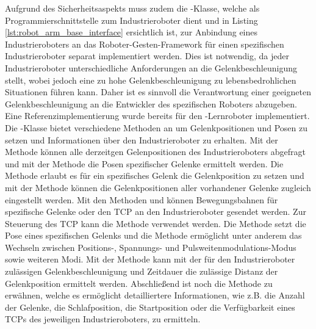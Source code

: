 Aufgrund des Sicherheitsaspekts muss zudem die -Klasse, welche als Programmierschnittstelle zum Industrieroboter dient und in Listing \ref{lst:robot_arm_base_interface} ersichtlich ist, zur Anbindung eines Industrieroboters an das Roboter-Gesten-Framework für einen spezifischen Industrieroboter separat implementiert werden. Dies ist notwendig, da jeder Industrieroboter unterschiedliche Anforderungen an die Gelenkbeschleunigung stellt, wobei jedoch eine zu hohe Gelenkbeschleunigung zu lebensbedrohlichen Situationen führen kann. Daher ist es sinnvoll die Verantwortung einer geeigneten Gelenkbeschleunigung an die Entwickler des spezifischen Roboters abzugeben. Eine Referenzimplementierung wurde bereits für den -Lernroboter implementiert. Die -Klasse bietet verschiedene Methoden an um Gelenkpositionen und Posen zu setzen und Informationen über den Industrieroboter zu erhalten. Mit der Methode  können alle derzeitgen Gelenpositionen des Industrieroboters abgefragt und mit der Methode  die Posen spezifischer Gelenke ermittelt werden. Die Methode  erlaubt es für ein spezifisches Gelenk die Gelenkposition zu setzen und mit der Methode  können die Gelenkpositionen aller vorhandener Gelenke zugleich eingestellt werden. Mit den Methoden  und  können Bewegungsbahnen für spezifische Gelenke oder den TCP an den Industrieroboter gesendet werden. Zur Steuerung des TCP kann die Methode  verwendet werden. Die Methode  setzt die Pose eines spezifischen Gelenks und die Methode  ermöglicht unter anderem das Wechseln zwischen Positions-, Spannungs- und Pulsweitenmodulations-Modus sowie weiteren Modi. Mit der Methode  kann mit der für den Industrieroboter zulässigen Gelenkbeschleunigung und Zeitdauer die zulässige Distanz der Gelenkposition ermittelt werden. Abschließend ist noch die Methode  zu erwähnen, welche es ermöglicht detailliertere Informationen, wie z.B. die Anzahl der Gelenke, die Schlafposition, die Startposition oder die Verfügbarkeit eines TCPs des jeweiligen Industrieroboters, zu ermitteln.

